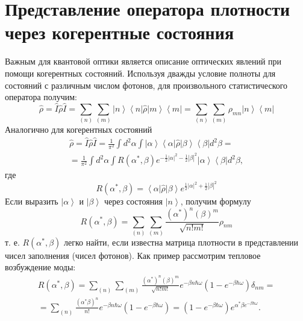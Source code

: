 \section{Представление оператора плотности через когерентные
  состояния}
Важным для квантовой оптики является описание оптических явлений при
помощи когерентных состояний. Используя дважды условие полноты для  
состояний с различным числом фотонов, для произвольного
статистического оператора получим: 
\[
\hat{\rho} = \hat{I}\hat{\rho}\hat{I} = 
\sum_{(n)}\sum_{(m)}
\left|n\right>\left<n\right|\hat{\rho}\left|m\right>\left<m\right| = 
\sum_{(n)}\sum_{(m)} \rho_{mn}\left|n\right>\left<m\right|
\]
Аналогично для когерентных состояний
\begin{eqnarray}
\hat{\rho} = \hat{I}\hat{\rho}\hat{I} = 
\frac{1}{\pi^2}\int d^2\alpha\int
\left|\alpha\right>\left<\alpha\right|\hat{\rho}\left|\beta\right>\left<\beta\right|
d^2 \beta = 
\nonumber \\
= \frac{1}{\pi^2} \int d^2\alpha \int
R\left(\alpha^{*}, \beta\right) e^{-\frac{1}{2}\left|\alpha\right|^2 -\frac{1}{2}\left|\beta\right|^2}
\left|\alpha\right>\left<\beta\right|d^2 \beta ,
\end{eqnarray}
где
\[
R\left(\alpha^{*}, \beta\right) =
\left<\alpha\right|\hat{\rho}\left|\beta\right>
e^{\frac{1}{2}\left|\alpha\right|^2 +\frac{1}{2}\left|\beta\right|^2}
\]
Если выразить $\left|\alpha\right>$ и $\left|\beta\right>$ через
состояния $\left|n\right>$,  получим формулу 
\begin{equation}
R\left(\alpha^{*}, \beta\right) = \sum_{(n)}\sum_{(m)}
\frac{\left(\alpha^{*}\right)^n \left(\beta\right)^m}{\sqrt{n!m!}}\rho_{nm}
\end{equation}
т. е. $R\left(\alpha^{*}, \beta\right)$ легко найти, если известна
матрица плотности 
в представлении чисел заполнения (чисел
фотонов). Как пример рассмотрим тепловое возбуждение моды: 
\begin{eqnarray}
R\left(\alpha^{*}, \beta\right) = \sum_{(n)}\sum_{(m)}
\frac{\left(\alpha^{*}\right)^n \left(\beta\right)^m}{\sqrt{n!m!}}
e^{-\beta n \hbar \omega}\left(1  -  e^{-\beta \hbar \omega}\right)
\delta_{nm} = 
\nonumber \\
= \sum_{(n)}\frac{\left(\alpha^{*} \beta\right)^n }{n!}
e^{-\beta n \hbar \omega}\left(1  -  e^{-\beta \hbar \omega}\right) =
\left(1  -  e^{-\beta \hbar \omega}\right) e^{\alpha^{*}\beta
  e^{-\beta \hbar \omega}}.
\end{eqnarray}

